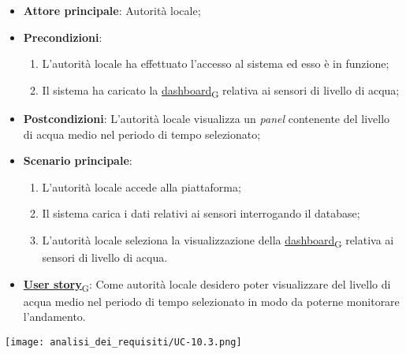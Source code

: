 \begin{itemize}
	\item \textbf{Attore principale}: Autorità locale;
	\item \textbf{Precondizioni}:
	      \begin{enumerate}
		      \item L'autorità locale ha effettuato l'accesso al sistema ed esso è in funzione;
		      \item Il sistema ha caricato la \href{https://7last.github.io/docs/rtb/documentazione-interna/glossario\#dashboard}{dashboard\textsubscript{G}} relativa ai sensori di livello di acqua;
	      \end{enumerate}
	\item \textbf{Postcondizioni}: L'autorità locale visualizza un \textit{panel} contenente del livello di acqua medio nel periodo di tempo selezionato;
	\item \textbf{Scenario principale}:
	      \begin{enumerate}
		      \item L'autorità locale accede alla piattaforma;
		      \item Il sistema carica i dati relativi ai sensori interrogando il database;
		      \item L'autorità locale seleziona la visualizzazione della \href{https://7last.github.io/docs/rtb/documentazione-interna/glossario\#dashboard}{dashboard\textsubscript{G}} relativa ai sensori di livello di acqua.
	      \end{enumerate}
	\item \href{https://7last.github.io/docs/rtb/documentazione-interna/glossario\#user-story}{\textbf{User story}\textsubscript{G}}:
	      Come autorità locale desidero poter visualizzare del livello di acqua medio nel periodo di tempo selezionato
	      in modo da poterne monitorare l'andamento.
\end{itemize}
\begin{center}
	\texttt{[image: analisi\_dei\_requisiti/UC-10.3.png]}
\end{center}

